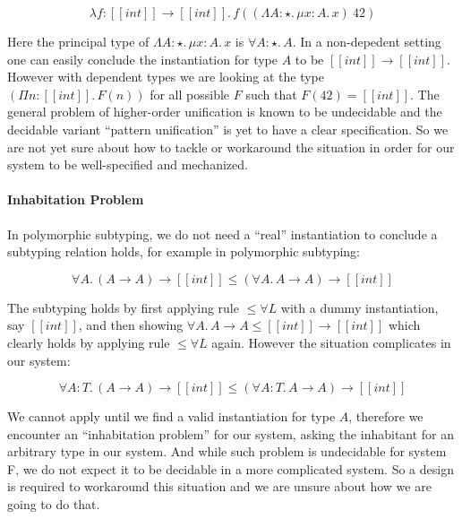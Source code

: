 \begin{equation*}
    \lambda f : [[int]] \rightarrow [[int]].\, f ((\Lambda A : \star.\,\mu x : A.\, x)~42)
\end{equation*}

Here the principal type of $\Lambda A : \star.\,\mu x : A.\, x$ is $\forall A : \star.\, A$.
In a non-depedent setting one can easily conclude the instantiation for type $A$ to be
 $[[int]] \rightarrow [[int]]$. However with dependent types we are looking at
the type $(\Pi n : [[int]].\, F(n))$ for all possible $F$ such that $F(42) = [[int]]$.
The general problem of higher-order unification is known to be undecidable\cite{goldfarb1981undecidability}
and the decidable variant ``pattern unification''\cite{miller1991unification}
is yet to have a clear specification.
So we are not yet sure about how to tackle or workaround the situation in order
for our system to be well-specified and mechanized.

\paragraph{Inhabitation Problem}

In polymorphic subtyping, we do not need a ``real'' instantiation to conclude
a subtyping relation holds, for example in polymorphic subtyping:

\begin{equation*}
    \forall A.\, (A \rightarrow A) \rightarrow [[int]] \le (\forall A.\, A \rightarrow A) \rightarrow [[int]]
\end{equation*}

The subtyping holds by first applying rule $\le\forall L$ with a dummy instantiation,
say $[[int]]$, and then showing $\forall A.\, A \rightarrow A \le [[int]] \rightarrow [[int]]$
which clearly holds by applying rule $\le\forall L$ again. However the situation
complicates in our system:

\begin{equation*}
    \forall A : T.\, (A \rightarrow A) \rightarrow [[int]] \le (\forall A : T.\, A \rightarrow A) \rightarrow [[int]]
\end{equation*}

We cannot apply  until we find a valid instantiation for type $A$,
therefore we encounter an ``inhabitation problem'' for our system, asking the
inhabitant for an arbitrary type in our system. And while such problem is
undecidable for system F\cite{dudenhefner2019simpler}, we do not expect it to be
decidable in a more complicated system. So a design is required to workaround
this situation and we are unsure about how we are going to do that.

